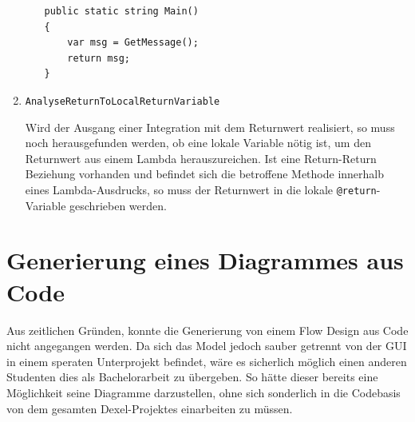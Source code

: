 \begin{enumerate}
\begin{itemize}
\begin{lstlisting}[caption=Return-Return-Beziehung]
public static string Main()
{
	var msg = GetMessage();
	return msg;
}
\end{lstlisting}		    
		    
		\end{itemize}
			\item \texttt{AnalyseReturnToLocalReturnVariable}
			
			Wird der Ausgang einer Integration mit dem Returnwert realisiert, so muss noch herausgefunden werden, ob eine lokale Variable nötig ist, um den Returnwert aus
			einem Lambda herauszureichen. Ist eine Return-Return Beziehung vorhanden und befindet sich die betroffene Methode innerhalb eines Lambda-Ausdrucks, so muss der Returnwert in die lokale \texttt{@return}-Variable geschrieben werden.
	\end{enumerate}
	



\section{Generierung eines Diagrammes aus Code}

Aus zeitlichen Gründen, konnte die Generierung von einem Flow Design aus Code nicht angegangen werden. 
Da sich das Model jedoch sauber getrennt von der GUI in
einem speraten Unterprojekt befindet, wäre es sicherlich möglich einen anderen
Studenten dies als Bachelorarbeit zu übergeben. So hätte dieser bereits eine
Möglichkeit seine Diagramme darzustellen, ohne sich sonderlich in die
Codebasis von dem gesamten Dexel-Projektes einarbeiten zu müssen.
